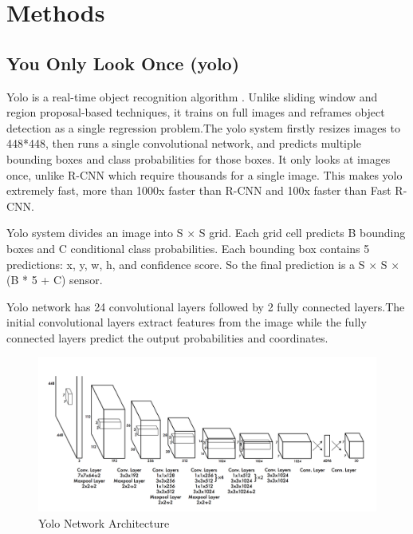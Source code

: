 \section{Methods}

\subsection{You Only Look Once (yolo)}
Yolo is a real-time object recognition algorithm \cite{yolo}. Unlike sliding window and region proposal-based techniques, it trains on full images and reframes object detection as a single regression problem.The yolo system firstly resizes images to 448*448, then runs a single convolutional network, and predicts multiple bounding boxes and class probabilities for those boxes. It only looks at images once, unlike R-CNN which require thousands for a single image. This makes yolo extremely fast, more than 1000x faster than R-CNN and 100x faster than Fast R-CNN. 

Yolo system divides an image into S × S grid. Each grid cell predicts B bounding boxes and C conditional class probabilities. Each bounding box contains 5 predictions: x, y, w, h, and confidence score. So the final prediction is a S × S × (B * 5 + C) sensor.

Yolo network has 24 convolutional layers followed by 2 fully connected layers.The initial convolutional layers extract features from the image while the fully connected layers predict the output probabilities and coordinates. 
\begin{figure}[H]
    \centering
    \includegraphics[width=1.0\linewidth]{img/yolo_network.png}
    \caption{Yolo Network Architecture}
\end{figure}%


